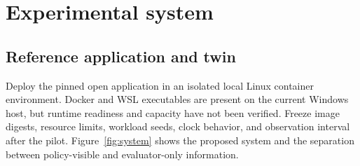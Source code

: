 ﻿\documentclass[sigconf,nonacm]{acmart}
\begin{document}
\section{Experimental system}
\subsection{Reference application and twin}
Deploy the pinned open application in an isolated local Linux container environment. Docker and WSL executables are present on the current Windows host, but runtime readiness and capacity have not been verified. Freeze image digests, resource limits, workload seeds, clock behavior, and observation interval after the pilot. Figure~\ref{fig:system} shows the proposed system and the separation between policy-visible and evaluator-only information.
\end{document}
